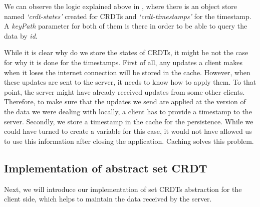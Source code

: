 We can observe the logic explained above in , where there is an object store named \textit{`crdt-states'} created for CRDTs and \textit{`crdt-timestamps'} for the timestamp. A \textit{keyPath} parameter for both of them is there in order to be able to query the data by \textit{id}. 

While it is clear why do we store the states of CRDTs, it might be not the case for why it is done for the timestamps. First of all, any updates a client makes when it loses the internet connection will be stored in the cache. However, when these updates are sent to the server, it needs to know how to apply them. To that point, the server might have already received updates from some other clients. Therefore, to make sure that the updates we send are applied at the version of the data we were dealing with locally, a client has to provide a timestamp to the server. Secondly, we store a timestamp in the cache for the persistence. While we could have turned to create a variable for this case, it would not have allowed us to use this information after closing the application. Caching solves this problem.

\subsection*{Implementation of abstract set CRDT}

Next, we will introduce our implementation of set CRDTs abstraction for the client side, which helps to maintain the data received by the server.

